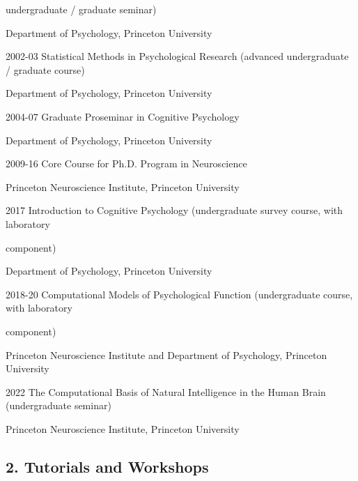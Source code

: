 \documentclass[10 pt]{article}
\begin{document}
\hspace{0.81in} undergraduate / graduate seminar)

\hspace{0.81in} Department of Psychology, Princeton University
    \smallskip

2002-03 \hspace{0.3in} Statistical Methods in Psychological Research (advanced undergraduate / graduate course)

\hspace{0.81in} Department of Psychology, Princeton University
    \smallskip

2004-07 \hspace{0.3in} Graduate Proseminar in Cognitive Psychology

\hspace{0.81in} Department of Psychology, Princeton University
    \smallskip

2009-16 \hspace{0.3in} Core Course for Ph.D. Program in Neuroscience

\hspace{0.81in} Princeton Neuroscience Institute, Princeton University
    \smallskip

2017 \hspace{0.48in} Introduction to Cognitive Psychology (undergraduate survey course, with laboratory

\hspace{0.81in} component)

\hspace{0.81in} Department of Psychology, Princeton University
    \smallskip

2018-20 \hspace{0.3in} Computational Models of Psychological Function (undergraduate course, with laboratory

\hspace{0.81in} component)

\hspace{0.81in} Princeton Neuroscience Institute and Department of Psychology, Princeton University
    \smallskip

2022 \hspace{0.51in} The Computational Basis of Natural Intelligence in the Human Brain (undergraduate seminar)

\hspace{0.81in} Princeton Neuroscience Institute, Princeton University
    \smallskip

\subsection*{2. Tutorials and Workshops} \label{secTEACHING2}
    \medskip
\end{document}
